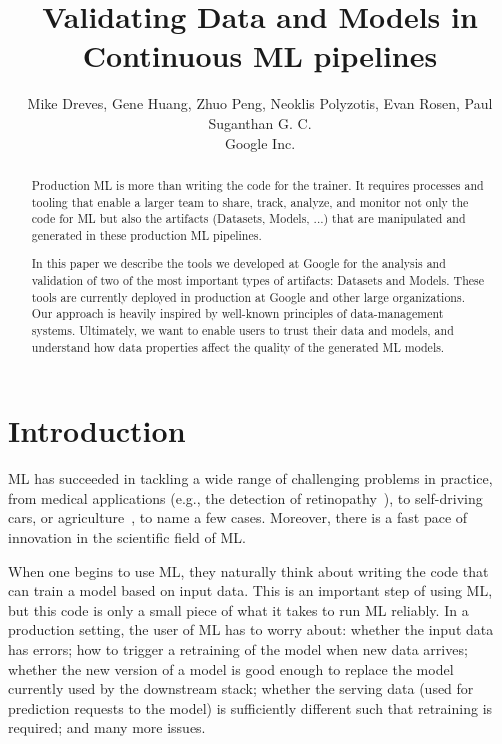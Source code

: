 \documentclass[11pt]{article}
\begin{document}
\title{Validating Data and Models in Continuous ML pipelines}
\author{ Mike Dreves, Gene Huang, Zhuo Peng, Neoklis Polyzotis, Evan Rosen, Paul Suganthan G. C.\\
{\small Google Inc.}}
\maketitle

\begin{abstract}
Production ML is more than writing the code for the trainer. It requires processes and tooling that enable a larger team to 
share, track, analyze, and monitor not only the code for ML but also the artifacts (Datasets, Models, ...) that are manipulated and 
generated in these production ML pipelines. 

In this paper we describe the tools we developed at Google for the analysis and validation of two of the most important types
of artifacts: Datasets and Models. These tools are currently deployed in production at Google and other large organizations. 
Our approach is heavily inspired by well-known principles of data-management systems. Ultimately, 
we want to enable users to trust their data and models, and understand how data properties affect the quality of the generated ML models. 
\end{abstract}

\section{Introduction}
ML has succeeded in tackling a wide range of challenging problems in practice, from medical applications (e.g., the detection of retinopathy~\cite{retinopathy}), to self-driving cars, or agriculture~\cite{cucumbers}, to name a few cases. Moreover, there is a fast pace of innovation in the scientific field of ML.

When one begins to use ML, they naturally think about writing the code that can train a model based on input data. This is an important step of using ML, but this code is only a small piece of what it takes to run ML reliably. In a production setting, the user of ML has to worry about: whether the input data has errors; how to trigger a retraining of the model when new data arrives; whether the new version of a model is good enough to replace the model currently used by the downstream stack; whether the serving data (used for prediction requests to the model) is sufficiently different such that retraining is required; and many more issues. 
\end{document}
